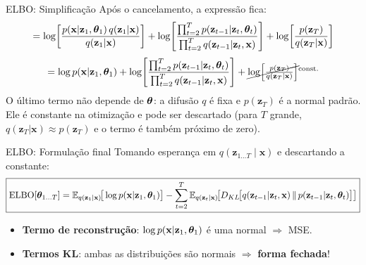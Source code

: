 \documentclass[aspectratio=169,xcolor=dvipsnames]{beamer}
\begin{document}
  \begin{frame}{ELBO: Simplificação}
    Após o cancelamento, a expressão fica:
    \vspace{0.2em}
    \[
      = \log\!\left[\frac{p(\mathbf{x}|\mathbf{z}_1,\bm{\theta}_1)\,q(\mathbf{z}_1|\mathbf{x})}{q(\mathbf{z}_1|\mathbf{x})}\right]
      + \log\!\left[\frac{\prod_{t=2}^{T} p(\mathbf{z}_{t-1}|\mathbf{z}_t,\bm{\theta}_t)}{\prod_{t=2}^{T} q(\mathbf{z}_{t-1}|\mathbf{z}_t,\mathbf{x})}\right]
      + \log\!\left[\frac{p(\mathbf{z}_T)}{q(\mathbf{z}_T|\mathbf{x})}\right]
    \]
    \vspace{0.2em}
    \[
      = \log p(\mathbf{x}|\mathbf{z}_1,\bm{\theta}_1)
      + \log\!\left[\frac{\prod_{t=2}^{T} p(\mathbf{z}_{t-1}|\mathbf{z}_t,\bm{\theta}_t)}{\prod_{t=2}^{T} q(\mathbf{z}_{t-1}|\mathbf{z}_t,\mathbf{x})}\right]
      + \cancel{\log\!\left[\tfrac{p(\mathbf{z}_T)}{q(\mathbf{z}_T|\mathbf{x})}\right]}^{\text{const.}}
    \]
    \vspace{0.2em}
    O último termo não depende de $\bm{\theta}$: a difusão $q$ é fixa e
    $p(\mathbf{z}_T)$ é a normal padrão. Ele é constante na otimização e
    pode ser descartado (para $T$ grande, $q(\mathbf{z}_T|\mathbf{x})\approx
    p(\mathbf{z}_T)$ e o termo é também próximo de zero).
  \end{frame}

  \begin{frame}{ELBO: Formulação final}
    Tomando esperança em $q(\mathbf{z}_{1\ldots T} \mid \mathbf{x})$ e
    descartando a constante:
    \vspace{0.2em}
    \[
      \boxed{
        \mathrm{ELBO}[\bm{\theta}_{1\ldots T}]
        = \mathbb{E}_{q(\mathbf{z}_1|\mathbf{x})}\!\big[\log p(\mathbf{x}|\mathbf{z}_1,\bm{\theta}_1)\big]
        - \sum_{t=2}^{T} \mathbb{E}_{q(\mathbf{z}_t|\mathbf{x})}\!\big[D_{KL}\!\big[q(\mathbf{z}_{t-1}|\mathbf{z}_t,\mathbf{x})\,\|\,p(\mathbf{z}_{t-1}|\mathbf{z}_t,\bm{\theta}_t)\big]\big]
      }
    \]
    \vspace{0.3em}
    \begin{itemize}
      \item \textcolor{ReconGreen}{\textbf{Termo de reconstrução}}:
      $\log p(\mathbf{x}|\mathbf{z}_1,\bm{\theta}_1)$ é uma normal $\Rightarrow$ MSE.
      \item \textcolor{DecBlue}{\textbf{Termos KL}}: ambas as
      distribuições são normais $\Rightarrow$ \textbf{forma fechada}!
    \end{itemize}
  \end{frame}
\end{document}
